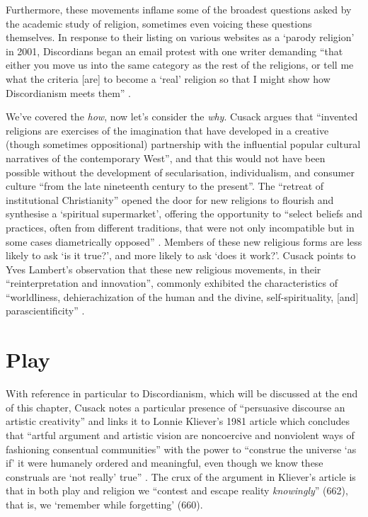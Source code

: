 \documentclass[Draft.tex]{subfiles}
\begin{document}
Furthermore, these movements inflame some of
the broadest questions asked by the academic study of religion,
sometimes even voicing these questions themselves.
In response to their listing on various websites as a `parody religion'
in 2001, Discordians began an email protest with one writer demanding
``that either you move us into the same category
as the rest of the religions, or tell me what the criteria [are]
to become a `real' religion so that I might show
how Discordianism meets them'' \parencite[209]{Chidester05}.

We've covered the \textit{how}, now let's consider the \textit{why}.
Cusack \parencite*[7]{Cusack10} argues that ``invented religions are
exercises of the imagination that have developed in a creative
(though sometimes oppositional) partnership with the influential
popular cultural narratives of the contemporary West'',
and that this would not have been possible without
the development of secularisation, individualism, and consumer culture
``from the late nineteenth century to the present''.
The ``retreat of institutional Christianity'' opened the door
for new religions to flourish and synthesise a `spiritual supermarket',
offering the opportunity to ``select beliefs and practices,
often from different traditions, that were not only incompatible
but in some cases diametrically opposed'' \parencite[25, 17]{Cusack10}.
Members of these new religious forms are less likely to ask
`is it true?', and more likely to ask `does it work?'.
Cusack \parencite[9]{Cusack10} points to Yves Lambert's observation that
these new religious movements, in their ``reinterpretation and innovation'',
commonly exhibited the characteristics of
``worldliness, dehierachization of the human and the divine,
self-spirituality, [and] parascientificity'' \parencite[303]{Lambert99}.


\section*{Play}
With reference in particular to Discordianism,
which will be discussed at the end of this chapter,
Cusack \parencite*[23]{Cusack10} notes a particular presence of
``persuasive discourse an artistic creativity'' and links it to
Lonnie Kliever's 1981 article which concludes that
``artful argument and artistic vision are noncoercive and nonviolent ways
of fashioning consentual communities'' with the power to
``construe the universe `as if' it were humanely ordered and meaningful,
even though we know these construals are
`not really' true'' \parencite[665]{Kliever81}.
The crux of the argument in Kliever's article is that
in both play and religion we
``contest and escape reality \textit{knowingly}'' (662),
that is, we `remember while forgetting' (660).
\end{document}
